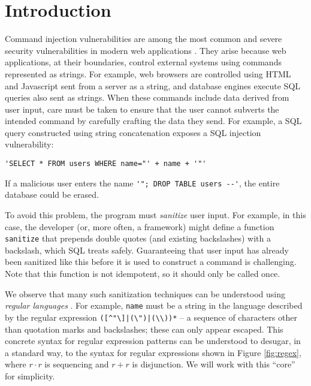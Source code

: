 \documentclass[9pt]{sig-alternate}
\theoremstyle{definition}
\begin{document}
\section{Introduction}\label{intro}
Command injection vulnerabilities are among the most common and severe security vulnerabilities in modern web applications \cite{OWASP}. They arise because web applications, at their boundaries, control external systems using commands represented as  strings. For example, web browsers are controlled using HTML and Javascript sent from a server as a string, and database engines execute SQL queries also sent as strings. When these commands include data derived from user input, care must be taken to ensure that the user cannot  subverts the intended command by carefully crafting the data they send. For example, a  SQL query constructed using string concatenation exposes a SQL injection vulnerability: 
\begin{lstlisting}[numbers=none]
'SELECT * FROM users WHERE name="' + name + '"'
\end{lstlisting}
If a malicious user enters the name \lstinline{'"; DROP TABLE users --'}, the entire database could be erased. 

To avoid this problem, the program must \emph{sanitize} user input. For example, in this case, the developer (or, more often, a framework) might define a function \verb|sanitize| that prepends double quotes (and existing backslashes)  with a backslash, which SQL treats safely. Guaranteeing that user input has already been sanitized like this before it is used to construct a command is challenging. Note that this function is not idempotent, so it should only be called once.

We observe that many such sanitization techniques can be understood using \emph{regular languages} \cite{cinderella}. For example, \verb|name| must be a string in the language described by the regular expression \verb!([^"\]|(\")|(\\))*! -- a sequence of characters other than quotation marks and backslashes; these can only appear escaped. This concrete syntax for regular expression patterns can be understood to desugar, in a standard way, to the syntax for regular expressions shown in Figure \ref{fig:regex}, where $r \cdot r$ is sequencing and $r + r$ is  disjunction. We will work with this ``core'' for simplicity.
\end{document}
